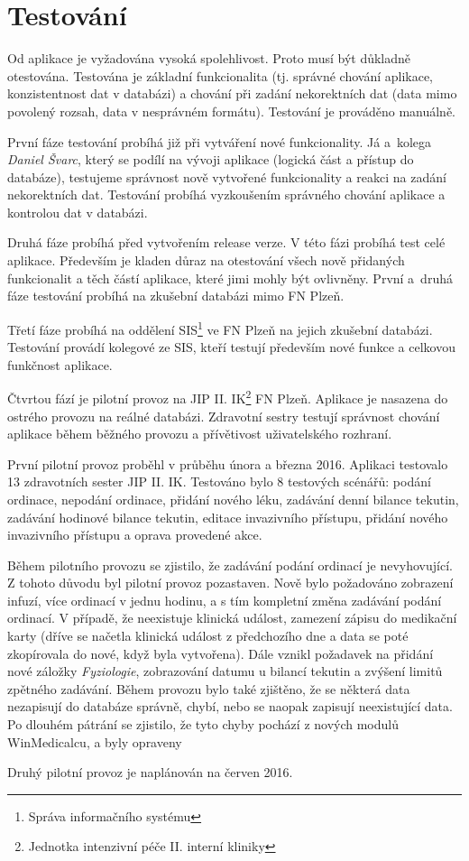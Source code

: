 \chapter{Testování}
\label{ch:test}

Od aplikace je vyžadována vysoká spolehlivost. Proto musí být důkladně otestována. Testována je základní funkcionalita (tj. správné chování aplikace, konzistentnost dat v databázi) a chování při zadání nekorektních dat (data mimo povolený rozsah, data v nesprávném formátu). Testování je prováděno manuálně.

První fáze testování probíhá již při vytváření nové funkcionality. Já a~kolega \emph{Daniel Švarc}, který se podílí na vývoji aplikace (logická část a přístup do databáze), testujeme správnost nově vytvořené funkcionality a reakci na zadání nekorektních dat. Testování probíhá vyzkoušením správného chování aplikace a kontrolou dat v databázi.

Druhá fáze probíhá před vytvořením release verze. V této fázi probíhá test celé aplikace. Především je kladen důraz na otestování všech nově přidaných funkcionalit a těch částí aplikace, které jimi mohly být ovlivněny. První a~druhá fáze testování probíhá na zkušební databázi mimo FN Plzeň.

Třetí fáze probíhá na oddělení SIS\footnote{Správa informačního systému} ve FN Plzeň na jejich zkušební databázi. Testování provádí kolegové ze SIS, kteří testují především nové funkce a celkovou funkčnost aplikace.

Čtvrtou fází je pilotní provoz na JIP II. IK\footnote{Jednotka intenzivní péče II. interní kliniky} FN Plzeň. Aplikace je nasazena do ostrého provozu na reálné databázi. Zdravotní sestry testují správnost chování aplikace během běžného provozu a přívětivost uživatelského rozhraní.

První pilotní provoz proběhl v průběhu února a března 2016. Aplikaci testovalo 13 zdravotních sester JIP II. IK. Testováno bylo 8 testových scénářů: podání ordinace, nepodání ordinace, přidání nového léku, zadávání denní bilance tekutin, zadávání hodinové bilance tekutin, editace invazivního přístupu, přidání nového invazivního přístupu a oprava provedené akce.

Během pilotního provozu se zjistilo, že zadávání podání ordinací je nevyhovující. Z tohoto důvodu byl pilotní provoz pozastaven. Nově bylo požadováno zobrazení infuzí, více ordinací v jednu hodinu, a s tím kompletní změna zadávání podání ordinací. V případě, že neexistuje klinická událost, zamezení zápisu do medikační karty (dříve se načetla klinická událost z předchozího dne a data se poté zkopírovala do nové, když byla vytvořena).  Dále vznikl požadavek na přidání nové záložky \emph{Fyziologie}, zobrazování datumu u bilancí tekutin a zvýšení limitů zpětného zadávání. Během provozu bylo také zjištěno, že se některá data nezapisují do databáze správně, chybí, nebo se naopak zapisují neexistující data. Po dlouhém pátrání se zjistilo, že tyto chyby pochází z nových modulů WinMedicalcu, a byly opraveny

Druhý pilotní provoz je naplánován na červen 2016.